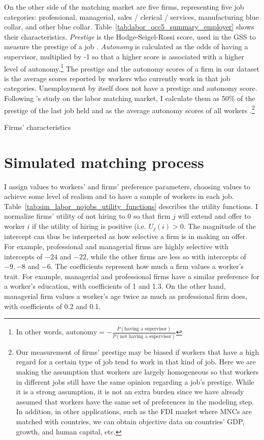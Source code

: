 On the other side of the matching market are five firms, representing five job categories:
professional, managerial, sales / clerical / services, manufacturing blue
collar, and other blue collar. Table~\ref{tab:labor_occ5_summary_employer} shows
their characteristics. \textit{Prestige} is the Hodge-Seigel-Rossi score, used
in the GSS to measure the prestige of a job \citep{Hodge1964,
  NORC2014}. \textit{Autonomy} is calculated as the odds of having a supervisor, multiplied
by -1 so that a higher score is associated with a higher level of
autonomy.\footnote{In other words, $\text{autonomy} = -\frac{P(\text{having a
      supervisor})}{P(\text{not having a supervisor})}$} The prestige and the
autonomy scores of a firm in our dataset is the average scores reported by
workers who currently work in that job categories. Unemployment by itself does
not have a prestige and autonomy score. Following \citet{Logan1996}'s study on
the labor matching market, I calculate them as 50\%
of the prestige of the last job held and as the average autonomy scores of all
workers \citep{Logan1996}.\footnote{Our measurement of firms' prestige may be
  biased if workers that have a high regard for a certain type of job tend to
  work in that kind of job. Here we are making the assumption that workers are
  largely homogeneous so that workers in different jobs still have the same
  opinion regarding a job's prestige. While it is a strong assumption, it is not
an extra burden since we have already assumed that workers have the same set
of preferences in the modeling step. In addition, in other applications, such
as the FDI market where MNCs are matched with countries, we can obtain objective
data on countries' GDP, growth, and human capital, etc.}

\begin{table}[!ht]
  \centering
  \caption{Firms' characteristics}
  \label{tab:labor_occ5_summary_employer}

\end{table}

\section{Simulated matching process}

I assign values to workers' and firms' preference parameters, choosing values to
achieve some level of realism and to have a sample of workers in each job.
Table~\ref{tab:sim_labor_nojobs_utility_functions} describes the utility
functions. I normalize firms' utility of not hiring to 0 so that firm $j$ will
extend and offer to worker $i$ if the utility of hiring is positive (i.e.
$U_{j}(i) > 0$. The magnitude of the intercept can thus be interpreted as how
selective a firm is in making an offer. For example, professional and managerial
firms are highly selective with intercepts of $-24$ and $-22$, while the other
firms are less so with intercepts of $-9, -8$ and $-6$. The coefficients
represent how much a firm values a worker's trait. For example, managerial and
professional firms have a similar preference for a worker's education, with
coefficients of 1 and 1.3. On the other hand, managerial firm values a worker's age twice
as much as professional firm does, with coefficients of 0.2 and 0.1.

